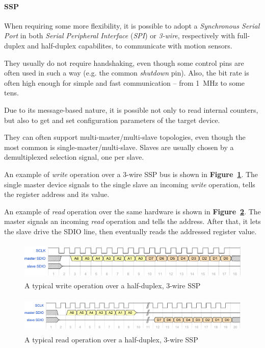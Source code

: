 \documentclass[a4paper,10pt]{article}
\newcommand{\citef}[1]{\textbf{Figure~\ref{#1}}}
\begin{document}
\begin{multicols}{2}
\paragraph{SSP}
When requiring some more flexibility, it is possible to adopt a
\emph{Synchronous Serial Port} in both \emph{Serial Peripheral Interface}
(\emph{SPI}) or \emph{3-wire}, respectively with full-duplex and half-duplex
capabilites, to communicate with motion sensors.

They usually do not require handshaking, even though some control pins are
often used in such a way (e.g. the common \emph{shutdown} pin). Also, the
bit rate is often high enough for simple and fast communication -- from
1~MHz to some tens.

Due to its message-based nature, it is possible not only to read internal
counters, but also to get and set configuration parameters of the target
device.

They can often support multi-master/multi-slave topologies, even though the
most common is single-master/multi-slave. Slaves are usually chosen by a
demultiplexed selection signal, one per slave.

An example of \emph{write} operation over a 3-wire SSP bus is shown in
\citef{fig:ssp_write}. The single master device signals to the single slave
an incoming \emph{write} operation, tells the register address and its value.

An example of \emph{read} operation over the same hardware is shown in
\citef{fig:ssp_read}. The master signals an incoming \emph{read} operation
and tells the address. After that, it lets the slave drive the SDIO line,
then eventually reads the addressed register value.

\begin{figure}[t]
	\centering
	\includegraphics[keepaspectratio=true,height=1.8cm]{images/ssp_write.pdf}
	\caption{A typical write operation over a half-duplex, 3-wire SSP}
	\label{fig:ssp_write}
\end{figure}

\begin{figure}[t]
	\centering
	\includegraphics[keepaspectratio=true,height=1.8cm]{images/ssp_read.pdf}
	\caption{A typical read operation over a half-duplex, 3-wire SSP}
	\label{fig:ssp_read}
\end{figure}



\end{multicols}
\end{document}
